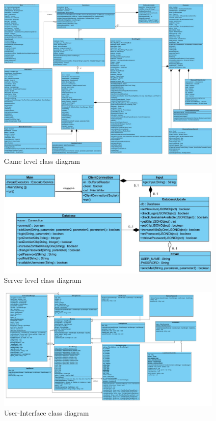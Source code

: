 \documentclass[letterpaper]{article}
\begin{document}
					\begin{figure}[H]
					\centering
					\includegraphics[width=180mm]{UML_Diagram/Class/Game_Classes.jpg}
					\caption{Game level class diagram}
					\label{overflow}
					\end{figure}
					
					\begin{figure}[hp!]
					\centering
					\includegraphics[width=180mm]{UML_Diagram/Class/Server_Classes.jpg}
					\caption{Server level class diagram}
					\label{overflow}
					\end{figure}
					
					\begin{figure}[hp!]
					\centering
					\includegraphics[width=180mm]{UML_Diagram/Class/GUI_Classes.jpg}
					\caption{User-Interface class diagram}
					\label{overflow}
					\end{figure}
					
\end{document}
